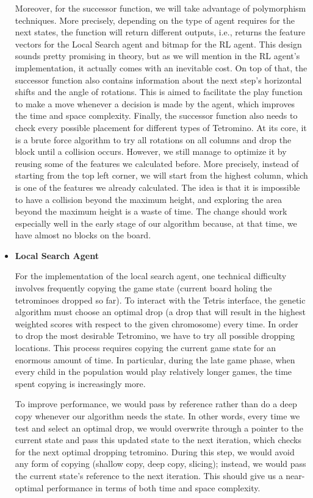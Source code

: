 \documentclass[letterpaper]{article} %
\begin{document}
\begin{itemize}
  Moreover, for the successor function, we will take advantage of polymorphism techniques. More precisely, depending on the type of agent requires for the next states, the function will return different outputs, i.e., returns the feature vectors for the Local Search agent and bitmap for the RL agent. This design sounds pretty promising in theory, but as we will mention in the RL agent's implementation, it actually comes with an inevitable cost. On top of that, the successor function also contains information about the next step's horizontal shifts and the angle of rotations. This is aimed to facilitate the play function to make a move whenever a decision is made by the agent, which improves the time and space complexity. Finally, the successor function also needs to check every possible placement for different types of Tetromino. At its core, it is a brute force algorithm to try all rotations on all columns and drop the block until a collision occurs. However, we still manage to optimize it by reusing some of the features we calculated before. More precisely, instead of starting from the top left corner, we will start from the highest column, which is one of the features we already calculated. The idea is that it is impossible to have a collision beyond the maximum height, and exploring the area beyond the maximum height is a waste of time. The change should work especially well in the early stage of our algorithm because, at that time, we have almost no blocks on the board.
 
  
  \item \textbf{Local Search Agent}
  

  For the implementation of the local search agent, one technical difficulty involves frequently copying the game state (current board holing the tetrominoes dropped so far). To interact with the Tetris interface, the genetic algorithm must choose an optimal drop (a drop that will result in the highest weighted scores with respect to the given chromosome) every time. In order to drop the most desirable Tetromino, we have to try all possible dropping locations. This process requires copying the current game state for an enormous amount of time. In particular, during the late game phase, when every child in the population would play relatively longer games, the time spent copying is increasingly more.
  
  To improve performance, we would pass by reference rather than do a deep copy whenever our algorithm needs the state. In other words, every time we test and select an optimal drop, we would overwrite through a pointer to the current state and pass this updated state to the next iteration, which checks for the next optimal dropping tetromino. During this step, we would avoid any form of copying (shallow copy, deep copy, slicing); instead, we would pass the current state's reference to the next iteration. This should give us a near-optimal performance in terms of both time and space complexity.
   

\end{itemize}
\end{document}
